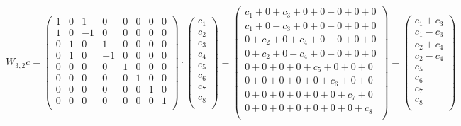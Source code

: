 \documentclass[12pt]{article}
\begin{document}
\[
W_{3, 2} c =
\begin{pmatrix}
1  &  0  & 1    &  0   & 0    & 0  &  0  &  0  \\
1  &  0  &  -1 &  0   & 0    & 0  &  0  &  0 \\
0   &  1  &  0  &  1   & 0    & 0  &  0  &  0 \\
0   &  1  &  0  &  -1 & 0    & 0  &  0  &  0 \\
0   &  0  &  0 & 0 &  1  &  0  & 0    & 0  \\
0   &  0  &  0 & 0 &  0  &  1  &  0   & 0  \\
0   &  0  &  0 & 0 &  0  &  0  &  1   & 0  \\
0   &  0  &  0 & 0 &  0  &  0  & 0    & 1  \\
\end{pmatrix}
\cdot 
\begin{pmatrix}
c_1 \\
c_2 \\
c_3 \\
c_4 \\
c_5 \\
c_6 \\
c_7 \\
c_8 \\
\end{pmatrix}
=
\begin{pmatrix}
c_1 + 0 + c_3 + 0 + 0 + 0 + 0 +0 \\
c_1 + 0 - c_3 + 0 + 0 + 0 + 0 +0 \\
0 + c_2 + 0 + c_4 + 0 + 0 + 0 +0 \\
0 + c_2 + 0 - c_4 + 0 + 0 + 0 +0 \\
0 + 0 + 0 + 0 + c_5 + 0 + 0 + 0  \\
0 + 0 + 0 + 0 + 0 + c_6 + 0 + 0 \\
0 + 0 + 0 + 0 + 0 + 0 + c_7 + 0 \\
0 + 0 + 0 + 0 + 0 + 0 + 0 + c_8 \\
\end{pmatrix}
=
\begin{pmatrix}
c_1 + c_3 \\
c_1 - c_3 \\
c_2 + c_4 \\
c_2 - c_4 \\
c_5 \\
c_6 \\
c_7 \\
c_8 \\
\end{pmatrix}
\]
\end{document}
